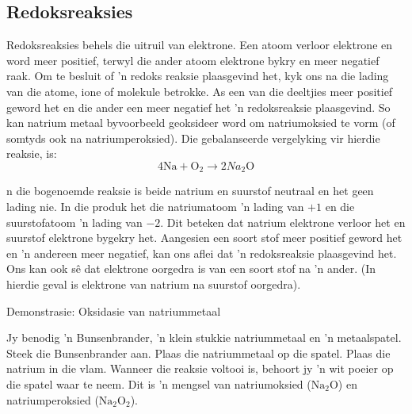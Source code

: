{{            \subsection*{Redoksreaksies }
            \nopagebreak
Redoksreaksies behels die uitruil van elektrone. Een atoom verloor elektrone en word meer positief, terwyl die ander atoom elektrone bykry en meer negatief raak. Om te besluit of  'n redoks reaksie plaasgevind het, kyk ons na die lading van die atome, ione of molekule betrokke. As een van die  deeltjies meer positief geword het en die ander een meer negatief het  'n redoksreaksie plaasgevind. So kan natrium metaal byvoorbeeld geoksideer word om natriumoksied te vorm (of somtyds ook na natriumperoksied). Die gebalanseerde vergelyking vir hierdie reaksie, is:
\label{m38719*id624}\nopagebreak\noindent{}
    \begin{equation*}
    4\text{Na}+{\text{O}}_{2}\to 2{Na}_{2}{\text{O}}
      \end{equation*}
\par \label{m38719*eip-815}
n die bogenoemde reaksie is beide natrium en suurstof neutraal en het geen lading nie. In die produk het die natriumatoom  'n lading van $+1$ en die suurstofatoom  'n lading van $-2$. Dit beteken dat natrium elektrone verloor het en suurstof elektrone bygekry het. Aangesien een soort stof meer positief geword het en   'n andereen meer negatief, kan ons aflei dat  'n redoksreaksie plaasgevind het. Ons kan ook s\^{e} dat elektrone oorgedra is van een soort stof na   'n ander. (In hierdie geval is elektrone van natrium na suurstof oorgedra).
\par \label{m38719*eip-878}
            \begin{g_experiment}{Demonstrasie: Oksidasie van natriummetaal}
            \nopagebreak
            \label{m38719*eip-355}
\begin{minipage}{.6\textwidth}
Jy benodig  'n Bunsenbrander, 'n klein stukkie natriummetaal en  'n metaalspatel. Steek die Bunsenbrander aan. Plaas die natriummetaal op die spatel. Plaas die natrium in die vlam. Wanneer die reaksie voltooi is, behoort jy  'n wit poeier op die spatel waar te neem. Dit is  'n mengsel van natriumoksied (${\text{Na}}_{2}\text{O}$) en natriumperoksied (${\text{Na}}_{2}{\text{O}}_{2}$).
\par \label{m38719*eip-980}
\end{minipage}

\end{g_experiment}}}
